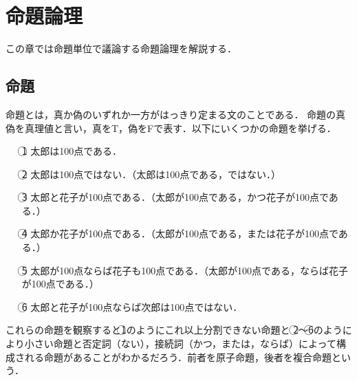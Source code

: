 \documentclass[10pt,b5paper,papersize,dvipdfmx]{jsbook}
\newcommand\maru[1]{\textcircled{\scriptsize{}#1}}
\begin{document}
\section{命題論理}
この章では命題単位で議論する命題論理を解説する．

\subsection{命題}
命題とは，真か偽のいずれか一方がはっきり定まる文のことである．
命題の真偽を真理値と言い，真をT，偽をFで表す．以下にいくつかの命題を挙げる．
\begin{itemize}
  \item[\maru{1}]太郎は100点である．
  \item[\maru{2}]太郎は100点ではない．（太郎は100点である，ではない．）
  \item[\maru{3}]太郎と花子が100点である．（太郎が100点である，かつ花子が100点である．）
  \item[\maru{4}]太郎か花子が100点である．（太郎が100点である，または花子が100点である．）
  \item[\maru{5}]太郎が100点ならば花子も100点である．（太郎が100点である，ならば花子が100点である．）
  \item[\maru{6}]太郎と花子が100点ならば次郎は100点ではない．
\end{itemize}
これらの命題を観察すると\maru{1}のようにこれ以上分割できない命題と
\maru{2}～\maru{6}のようにより小さい命題と否定詞（ない），接続詞（かつ，または，ならば）によって構成される命題があることがわかるだろう．前者を原子命題，後者を複合命題という．
\end{document}
